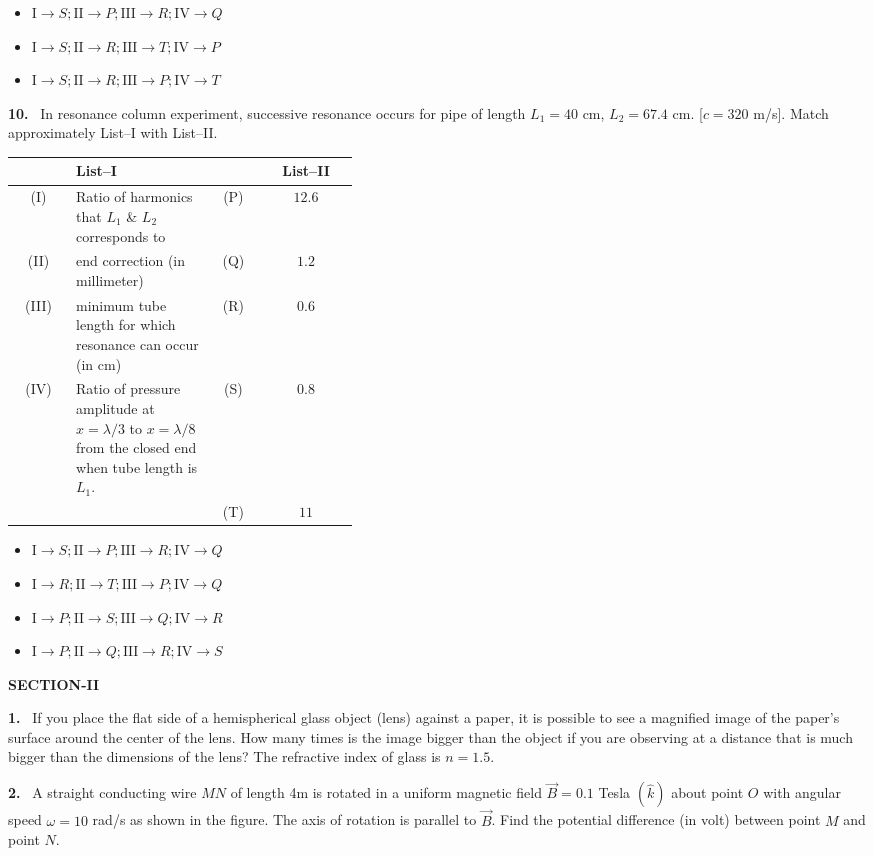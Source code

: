 \documentclass[10pt]{extarticle}
\newcommand{\sect}[1]{\par\smallskip\noindent\textbf{#1}\par}
\newcommand{\qn}[1]{\par\smallskip\noindent\textbf{#1.}~}
\newenvironment{qoptions}{\begin{itemize}[leftmargin=1.8em,itemsep=1pt,topsep=2pt,label={}]}{\end{itemize}}
\newcommand{\opt}[2]{\item[(#1)] #2}
\begin{document}
\begin{multicols}{2}
\begin{qoptions}
\opt{B}{$\mathrm I\to S;\allowbreak \mathrm{II}\to P;\allowbreak \mathrm{III}\to R;\allowbreak \mathrm{IV}\to Q$}
\opt{C}{$\mathrm I\to S;\allowbreak \mathrm{II}\to R;\allowbreak \mathrm{III}\to T;\allowbreak \mathrm{IV}\to P$}
\opt{D}{$\mathrm I\to S;\allowbreak \mathrm{II}\to R;\allowbreak \mathrm{III}\to P;\allowbreak \mathrm{IV}\to T$}
\end{qoptions}
\qn{10} In resonance column experiment, successive resonance occurs for pipe of length $L_1=40$ cm, $L_2=67.4$ cm. [$c=320$ m/s]. Match approximately List--I with List--II.\par
{\small\setlength{\tabcolsep}{3pt}\begin{tabular}{|c|p{0.4\linewidth}|c|c|}
\hline
 & \textbf{List--I} & & \textbf{List--II}\\ \hline
(I) & Ratio of harmonics that $L_1$ \& $L_2$ corresponds to & (P) & $12.6$\\ \hline
(II) & end correction (in millimeter) & (Q) & $1.2$\\ \hline
(III) & minimum tube length for which resonance can occur (in cm) & (R) & $0.6$\\ \hline
(IV) & Ratio of pressure amplitude at $x=\lambda/3$ to $x=\lambda/8$ from the closed end when tube length is $L_1$. & (S) & $0.8$\\ \hline
 & & (T) & $11$\\ \hline
\end{tabular}}\par
\begin{qoptions}
\opt{A}{$\mathrm I\to S;\allowbreak \mathrm{II}\to P;\allowbreak \mathrm{III}\to R;\allowbreak \mathrm{IV}\to Q$}
\opt{B}{$\mathrm I\to R;\allowbreak \mathrm{II}\to T;\allowbreak \mathrm{III}\to P;\allowbreak \mathrm{IV}\to Q$}
\opt{C}{$\mathrm I\to P;\allowbreak \mathrm{II}\to S;\allowbreak \mathrm{III}\to Q;\allowbreak \mathrm{IV}\to R$}
\opt{D}{$\mathrm I\to P;\allowbreak \mathrm{II}\to Q;\allowbreak \mathrm{III}\to R;\allowbreak \mathrm{IV}\to S$}
\end{qoptions}
\sect{SECTION-II}
\qn{1} If you place the flat side of a hemispherical glass object (lens) against a paper, it is possible to see a magnified image of the paper's surface around the center of the lens. How many times is the image bigger than the object if you are observing at a distance that is much bigger than the dimensions of the lens? The refractive index of glass is $n=1.5$.
\qn{2} A straight conducting wire $MN$ of length 4m is rotated in a uniform magnetic field $\vec B=0.1$ Tesla $(\hat k)$ about point $O$ with angular speed $\omega=10$ rad/s as shown in the figure. The axis of rotation is parallel to $\vec B$. Find the potential difference (in volt) between point $M$ and point $N$.

\end{multicols}
\end{document}
